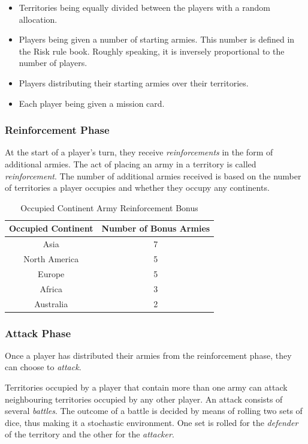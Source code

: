 \documentclass[parskip]{cs4rep}
\begin{document}
\begin{itemize}
\item
Territories being equally divided between the players with a random allocation.
\item
Players being given a number of starting armies. This number is defined in the Risk rule book. Roughly speaking, it is inversely proportional to the number of players. 
\item
Players distributing their starting armies over their territories.
\item
Each player being given a mission card.
\end{itemize}

\subsubsection{Reinforcement Phase}

At the start of a player's turn, they receive \textit{reinforcements} in the form of additional armies. The act of placing an army in a territory is called \textit{reinforcement}.  The number of additional armies received is based on the number of territories a player occupies and whether they occupy any continents.

\begin{table}[ht]
\centering
\begin{tabular}{|c|c|}
\hline 
\textbf{Occupied Continent} & \textbf{Number of Bonus Armies} \\ 
\hline 
Asia & 7 \\ 
\hline 
North America & 5 \\ 
\hline 
Europe & 5 \\ 
\hline 
Africa & 3 \\
\hline
Australia & 2 \\
\hline
\end{tabular}{}
\caption{Occupied Continent Army Reinforcement Bonus}
\label{table:continent-bonus}
\end{table}

\subsubsection{Attack Phase}

Once a player has distributed their armies from the reinforcement phase, they can choose to \textit{attack}. 

Territories occupied by a player that contain more than one army can attack neighbouring territories occupied by any other player. An attack consists of several \textit{battles}. The outcome of a battle is decided by means of rolling two sets of dice, thus making it a stochastic environment. One set is rolled for the \textit{defender} of the territory and the other for the \textit{attacker}. 
\end{document}
